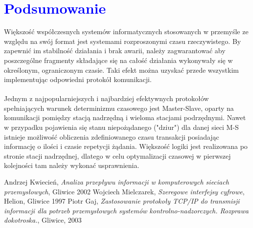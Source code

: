 \documentclass[a4paper,twoside]{article}
\begin{document}
\section{\textcolor{blue}{Podsumowanie}}
Większość współczesnych systemów informatycznych stosowanych w przemyśle ze względu na swój format jest systemami rozproszonymi czasu rzeczywistego. By zapewnić im stabilność działania i brak awarii, należy zagwarantować aby poszczególne fragmenty składające się na całość działania wykonywały się w określonym, ograniczonym czasie. Taki efekt można uzyskać przede wszystkim implementując odpowiedni protokół komunikacji. \\\\
Jednym z najpopularniejszych i najbardziej efektywnych protokołów spełniających warunek determinizmu czasowego jest Master-Slave, oparty na komunikacji pomiędzy stacją nadrzędną i wieloma stacjami podrzędnymi. Nawet w przypadku pojawienia się stanu niepożądanego ("dziur") dla danej sieci M-S istnieje możliwość obliczenia zdefiniowanego czasu transakcji posiadając informację o ilości i czasie repetycji żądania. Większość logiki jest realizowana po stronie stacji nadrzędnej, dlatego w celu optymalizacji czasowej w pierwszej kolejności tam należy wykonać usprawnienia.


\newpage
\begin{thebibliography}{2}
	 Andrzej Kwiecień, \textit{Analiza przepływu informacji w komputerowych sieciach przemysłowych}, Gliwice 2002
	 Wojciech Mielczarek, \textit{Szeregowe interfejsy cyfrowe}, Helion, Gliwice 1997
	 Piotr Gaj, \textit{Zastosowanie protokoły TCP/IP do transmisji informacji dla potrzeb przemysłowych systemów kontrolno-nadzorczych. Rozprawa dokotroska.}, Gliwice, 2003
\end{thebibliography}
\end{document}

